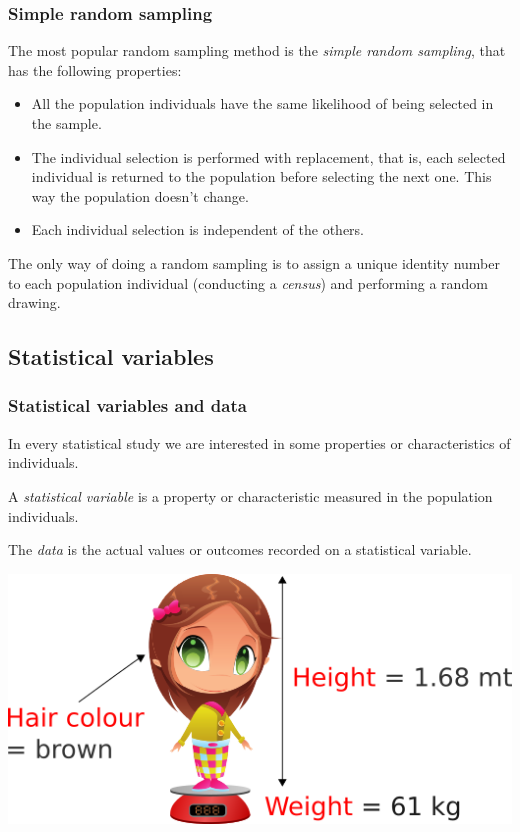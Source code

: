 \begin{frame}
\frametitle{Simple random sampling}
The most popular random sampling method is the \emph{simple random sampling}, that has the following properties:
\begin{itemize}
\item All the population individuals have the same likelihood of being selected in the sample. 
\item The individual selection is performed with replacement, that is, each selected individual is returned to the
population before selecting the next one. 
This way the population doesn't change. 
\item Each individual selection is independent of the others. 
\end{itemize}

The only way of doing a random sampling is to assign a unique identity number to each population individual
(conducting a \emph{census}) and performing a random drawing.
\end{frame}


\subsection{Statistical variables}

\begin{frame}
\frametitle{Statistical variables and data}
In every statistical study we are interested in some properties or characteristics of individuals. 
\begin{definition}
A \emph{statistical variable} is a property or characteristic measured in the population individuals. 

The \emph{data} is the actual values or outcomes recorded on a statistical variable. 
\end{definition}

\begin{center}
\includegraphics[scale=0.5]{img/introduction/statistical_variables.png}
\end{center}
\end{frame}


